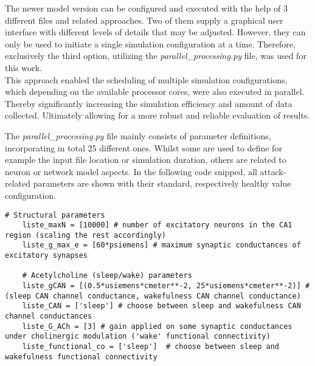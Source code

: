     The newer model version can be configured and executed with the help of 3 different files and related approaches. Two of them supply a graphical user interface with different levels of details that may be adjusted. However, they can only be used to initiate a single simulation configuration at a time. Therefore, exclusively the third option, utilizing the \textit{parallel\_processing.py} file, was used for this work.\\
    This approach enabled the scheduling of multiple simulation configurations, which depending on the available processor cores, were also executed in parallel. Thereby significantly increasing the simulation efficiency and amount of data collected. Ultimately allowing for a more robust and reliable evaluation of results. 

    The \textit{parallel\_processing.py} file mainly consists of parameter definitions, incorporating in total 25 different ones. Whilst some are used to define for example the input file location or simulation duration, others are related to neuron or network model aspects. In the following code snipped, all attack-related parameters are shown with their standard, respectively healthy value configuration.\\
    
    \begin{lstlisting}[caption={Example Parameter definition}]
    # Structural parameters
    liste_maxN = [10000] # number of excitatory neurons in the CA1 region (scaling the rest accordingly)
    liste_g_max_e = [60*psiemens] # maximum synaptic conductances of excitatory synapses
    
    # Acetylcholine (sleep/wake) parameters
    liste_gCAN = [(0.5*usiemens*cmeter**-2, 25*usiemens*cmeter**-2)] # (sleep CAN channel conductance, wakefulness CAN channel conductance)
    liste_CAN = ['sleep'] # choose between sleep and wakefulness CAN channel conductances
    liste_G_ACh = [3] # gain applied on some synaptic conductances under cholinergic modulation ('wake' functional connectivity)
    liste_functional_co = ['sleep']  # choose between sleep and wakefulness functional connectivity
    \end{lstlisting}

